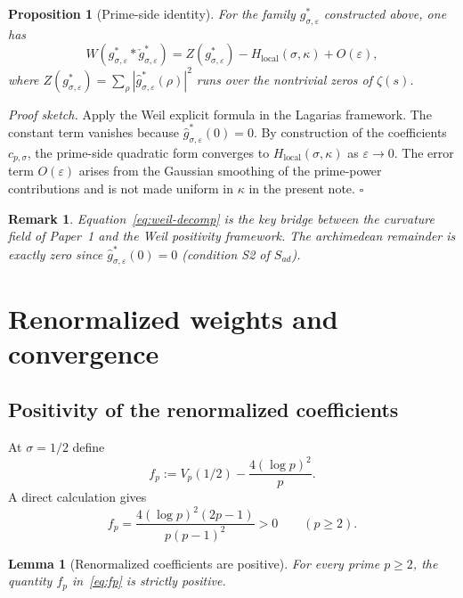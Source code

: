 \documentclass[11pt]{article}
\newtheorem*{lemma*}{Lemma}
\newtheorem*{proposition*}{Proposition}
\newtheorem*{remark*}{Remark}
\begin{document}
\begin{proposition*}[Prime-side identity]
For the family $g^*_{\sigma,\varepsilon}$ constructed above, one has
\begin{equation}\label{eq:weil-decomp}
W(g^*_{\sigma,\varepsilon} * \check g^*_{\sigma,\varepsilon})
=
Z(g^*_{\sigma,\varepsilon}) - H_{\mathrm{local}}(\sigma,\kappa) + O(\varepsilon),
\end{equation}
where
$Z(g^*_{\sigma,\varepsilon}) = \sum_{\rho}
|\widehat g^*_{\sigma,\varepsilon}(\rho)|^2$
runs over the nontrivial zeros of $\zeta(s)$.
\end{proposition*}

\textit{Proof sketch.}
Apply the Weil explicit formula in the Lagarias framework. The constant
term vanishes because $\widehat g^*_{\sigma,\varepsilon}(0)=0$.
By construction of the coefficients $c_{p,\sigma}$, the prime-side quadratic
form converges to $H_{\mathrm{local}}(\sigma,\kappa)$ as $\varepsilon\to 0$.
The error term $O(\varepsilon)$ arises from the Gaussian smoothing of the
prime-power contributions and is not made uniform in $\kappa$ in the present
note. \hfill$\square$

\begin{remark*}
Equation~\eqref{eq:weil-decomp} is the key bridge between the curvature field
of Paper~1 and the Weil positivity framework. The archimedean remainder is
exactly zero since $\widehat g^*_{\sigma,\varepsilon}(0) = 0$ (condition S2 of
$S_{ad}$).
\end{remark*}

\section{Renormalized weights and convergence}

\subsection{Positivity of the renormalized coefficients}

At $\sigma=1/2$ define
\[
f_p := V_p(1/2) - \frac{4(\log p)^2}{p}.
\]
A direct calculation gives
\begin{equation}\label{eq:fp}
f_p
= \frac{4(\log p)^2(2p-1)}{p(p-1)^2} > 0
\qquad (p\ge 2).
\end{equation}

\begin{lemma*}[Renormalized coefficients are positive]
For every prime $p\ge 2$, the quantity $f_p$ in~\eqref{eq:fp}
is strictly positive.
\end{lemma*}
\end{document}
